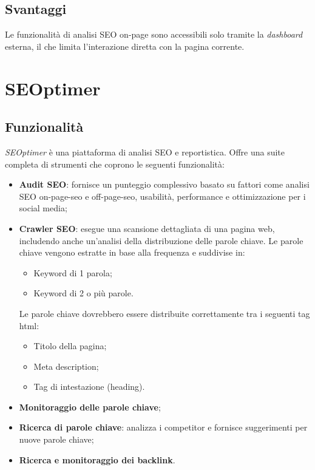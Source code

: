 \subsection{Svantaggi}
\par Le funzionalità di analisi SEO on-page sono accessibili solo tramite la \textit{dashboard} esterna, il che limita l'interazione diretta con la pagina corrente.

\section{SEOptimer}

\subsection{Funzionalità}
\par \textit{SEOptimer} è una piattaforma di analisi SEO e reportistica. Offre una suite completa di strumenti che coprono le seguenti funzionalità:
\begin{itemize}
    \item \textbf{Audit SEO}: fornisce un punteggio complessivo basato su fattori come analisi SEO \gls{on-page-seo} e \gls{off-page-seo}, usabilità, performance e ottimizzazione per i social media;
    \item \textbf{Crawler SEO}: esegue una scansione dettagliata di una pagina web, includendo anche un'analisi della distribuzione delle parole chiave. Le parole chiave vengono estratte in base alla frequenza e suddivise in:
    \begin{itemize}
        \item Keyword di 1 parola;
        \item Keyword di 2 o più parole.
    \end{itemize}
    Le parole chiave dovrebbero essere distribuite correttamente tra i seguenti tag \gls{html}: 
    \begin{itemize}
        \item Titolo della pagina;
        \item Meta description;
        \item Tag di intestazione (heading).
    \end{itemize}
    \item \textbf{Monitoraggio delle parole chiave};
    \item \textbf{Ricerca di parole chiave}: analizza i competitor e fornisce suggerimenti per nuove parole chiave;
    \item \textbf{Ricerca e monitoraggio dei \gls{backlink}}.
\end{itemize}

